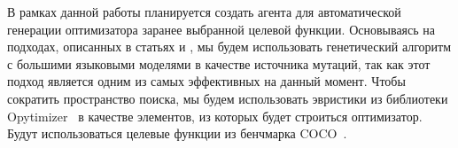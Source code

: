 \documentclass[a4paper,14pt]{extarticle}
\begin{document}



    В рамках данной работы планируется создать агента для автоматической генерации оптимизатора заранее выбранной целевой функции.
    Основываясь на подходах, описанных в статьях \cite{bibl:alphaevolve} и \cite{bibl:shinkaevolve}, мы будем использовать генетический алгоритм с большими языковыми моделями в качестве источника мутаций, так как этот подход является одним из самых эффективных на данный момент.
    Чтобы сократить пространство поиска, мы будем использовать эвристики из библиотеки Opytimizer~\cite{bibl:opytimizer} в качестве элементов, из которых будет строиться оптимизатор.
    Будут использоваться целевые функции из бенчмарка COCO~\cite{bibl:coco}.
\end{document}
